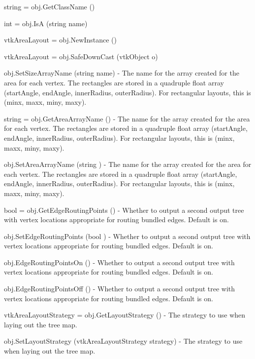 \begin{DoxyItemize}
\item {\ttfamily string = obj.\-Get\-Class\-Name ()}  
\item {\ttfamily int = obj.\-Is\-A (string name)}  
\item {\ttfamily vtk\-Area\-Layout = obj.\-New\-Instance ()}  
\item {\ttfamily vtk\-Area\-Layout = obj.\-Safe\-Down\-Cast (vtk\-Object o)}  
\item {\ttfamily obj.\-Set\-Size\-Array\-Name (string name)} -\/ The name for the array created for the area for each vertex. The rectangles are stored in a quadruple float array (start\-Angle, end\-Angle, inner\-Radius, outer\-Radius). For rectangular layouts, this is (minx, maxx, miny, maxy).  
\item {\ttfamily string = obj.\-Get\-Area\-Array\-Name ()} -\/ The name for the array created for the area for each vertex. The rectangles are stored in a quadruple float array (start\-Angle, end\-Angle, inner\-Radius, outer\-Radius). For rectangular layouts, this is (minx, maxx, miny, maxy).  
\item {\ttfamily obj.\-Set\-Area\-Array\-Name (string )} -\/ The name for the array created for the area for each vertex. The rectangles are stored in a quadruple float array (start\-Angle, end\-Angle, inner\-Radius, outer\-Radius). For rectangular layouts, this is (minx, maxx, miny, maxy).  
\item {\ttfamily bool = obj.\-Get\-Edge\-Routing\-Points ()} -\/ Whether to output a second output tree with vertex locations appropriate for routing bundled edges. Default is on.  
\item {\ttfamily obj.\-Set\-Edge\-Routing\-Points (bool )} -\/ Whether to output a second output tree with vertex locations appropriate for routing bundled edges. Default is on.  
\item {\ttfamily obj.\-Edge\-Routing\-Points\-On ()} -\/ Whether to output a second output tree with vertex locations appropriate for routing bundled edges. Default is on.  
\item {\ttfamily obj.\-Edge\-Routing\-Points\-Off ()} -\/ Whether to output a second output tree with vertex locations appropriate for routing bundled edges. Default is on.  
\item {\ttfamily vtk\-Area\-Layout\-Strategy = obj.\-Get\-Layout\-Strategy ()} -\/ The strategy to use when laying out the tree map.  
\item {\ttfamily obj.\-Set\-Layout\-Strategy (vtk\-Area\-Layout\-Strategy strategy)} -\/ The strategy to use when laying out the tree map.  

\end{DoxyItemize}
